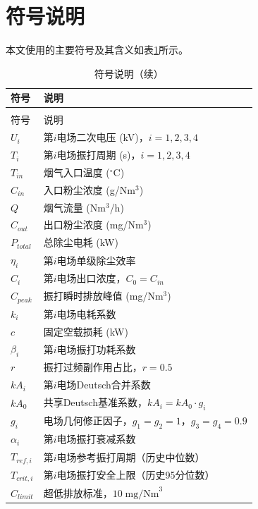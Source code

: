 
\section{符号说明}

本文使用的主要符号及其含义如表\ref{tab:symbols}所示。

\begin{longtable}{>{\centering\arraybackslash}p{}>{\centering\arraybackslash}p{}}
  \caption{符号说明}
  \label{tab:symbols} \\
  \toprule
  符号 & 说明 \\
  \midrule
  \endfirsthead
  \caption{符号说明（续）} \\
  \toprule
  符号 & 说明 \\
  \midrule
  \endhead
  \bottomrule
  \endfoot
  $U_i$ & 第$i$电场二次电压 (kV)，$i=1,2,3,4$ \\
  $T_i$ & 第$i$电场振打周期 (s)，$i=1,2,3,4$ \\
  $T_{in}$ & 烟气入口温度 ($^\circ$C) \\
  $C_{in}$ & 入口粉尘浓度 (g/Nm$^3$) \\
  $Q$ & 烟气流量 (Nm$^3$/h) \\
  $C_{out}$ & 出口粉尘浓度 (mg/Nm$^3$) \\
  $P_{total}$ & 总除尘电耗 (kW) \\
  $\eta_i$ & 第$i$电场单级除尘效率 \\
  $C_i$ & 第$i$电场出口浓度，$C_0=C_{in}$ \\
  $C_{peak}$ & 振打瞬时排放峰值 (mg/Nm$^3$) \\
  $k_i$ & 第$i$电场电耗系数 \\
  $c$ & 固定空载损耗 (kW) \\
  $\beta_i$ & 第$i$电场振打功耗系数 \\
  $r$ & 振打过频副作用占比，$r=0.5$ \\
  $kA_i$ & 第$i$电场Deutsch合并系数 \\
  $kA_0$ & 共享Deutsch基准系数，$kA_i=kA_0\cdot g_i$ \\
  $g_i$ & 电场几何修正因子，$g_1=g_2=1$，$g_3=g_4=0.9$ \\
  $\alpha_i$ & 第$i$电场振打衰减系数 \\
  $T_{ref,i}$ & 第$i$电场参考振打周期（历史中位数） \\
  $T_{crit,i}$ & 第$i$电场振打安全上限（历史95分位数） \\
  $C_{limit}$ & 超低排放标准，$10\;\text{mg/Nm}^3$ \\

\end{longtable}
